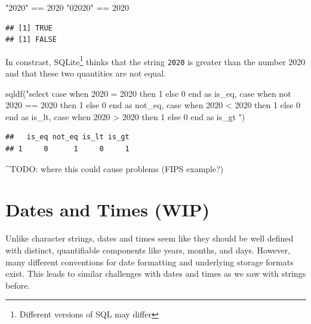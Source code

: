 \documentclass[
]{krantz}
\makeatletter
\newenvironment{Shaded}{\begin{snugshade}}{\end{snugshade}}
\newcommand{\DecValTok}[1]{\textcolor[rgb]{0.06,0.06,0.06}{#1}}
\newcommand{\FunctionTok}[1]{\textcolor[rgb]{0,0,0}{#1}}
\newcommand{\NormalTok}[1]{#1}
\newcommand{\SpecialCharTok}[1]{\textcolor[rgb]{0,0,0}{#1}}
\newcommand{\StringTok}[1]{\textcolor[rgb]{0.5,0.5,0.5}{#1}}
\newenvironment{kframe}{%
\medskip{}
\setlength{\fboxsep}{.8em}
 \def\at@end@of@kframe{}%
 \ifinner\ifhmode%
  \def\at@end@of@kframe{\end{minipage}}%
  \begin{minipage}{\columnwidth}%
 \fi\fi%
 \def\FrameCommand##1{\hskip\@totalleftmargin \hskip-\fboxsep
 \colorbox{shadecolor}{##1}\hskip-\fboxsep
     \hskip-\linewidth \hskip-\@totalleftmargin \hskip\columnwidth}%
 \MakeFramed {\advance\hsize-\width
   \@totalleftmargin\z@ \linewidth\hsize
   \@setminipage}}%
 {\par\unskip\endMakeFramed%
 \at@end@of@kframe}
\renewenvironment{Shaded}{\begin{kframe}}{\end{kframe}}
\makeatother
\begin{document}
\begin{Shaded}
\begin{Highlighting}[]
\StringTok{"2020"} \SpecialCharTok{==} \DecValTok{2020}
\StringTok{"02020"} \SpecialCharTok{==} \DecValTok{2020}
\end{Highlighting}
\end{Shaded}

\begin{verbatim}
## [1] TRUE
## [1] FALSE
\end{verbatim}

In constrast, SQLite\footnote{Different versions of SQL may differ} thinks that the string \texttt{\textquotesingle{}2020\textquotesingle{}} is greater than the number 2020 and that these two quantities are not equal.

\begin{Shaded}
\begin{Highlighting}[]
\FunctionTok{sqldf}\NormalTok{(}\StringTok{"select }
\StringTok{      case when \textquotesingle{}2020\textquotesingle{} = 2020 then 1 else 0 end as is\_eq,}
\StringTok{      case when not \textquotesingle{}2020\textquotesingle{} == 2020 then 1 else 0 end as not\_eq,}
\StringTok{      case when \textquotesingle{}2020\textquotesingle{} \textless{} 2020 then 1 else 0 end as is\_lt,}
\StringTok{      case when \textquotesingle{}2020\textquotesingle{} \textgreater{} 2020 then 1 else 0 end as is\_gt}
\StringTok{      "}\NormalTok{)}
\end{Highlighting}
\end{Shaded}

\begin{verbatim}
##   is_eq not_eq is_lt is_gt
## 1     0      1     0     1
\end{verbatim}

\^{}TODO: where this could cause problems (FIPS example?)

\hypertarget{dates-and-times-wip}{%
\section{Dates and Times (WIP)}\label{dates-and-times-wip}}

Unlike character strings, dates and times seem like they should be well defined with distinct, quantifiable components like years, months, and days. However, many different conventions for date formatting and underlying storage formats exist. This leads to similar challenges with dates and times as we saw with strings before.
\end{document}
